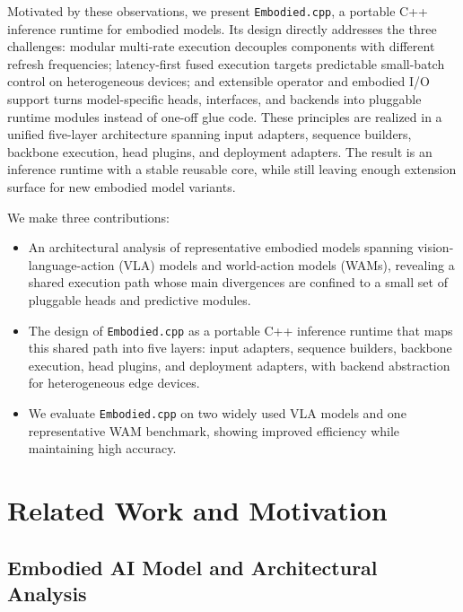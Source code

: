 \documentclass[11pt,letterpaper,logo]{seu-paisys}
\newcommand{\system}{\texttt{Embodied.cpp}\xspace}
\begin{document}
Motivated by these observations, we present \system, a portable C++ inference runtime for embodied models. Its design directly addresses the three challenges: modular multi-rate execution decouples components with different refresh frequencies; latency-first fused execution targets predictable small-batch control on heterogeneous devices; and extensible operator and embodied I/O support turns model-specific heads, interfaces, and backends into pluggable runtime modules instead of one-off glue code. These principles are realized in a unified five-layer architecture spanning input adapters, sequence builders, backbone execution, head plugins, and deployment adapters. The result is an inference runtime with a stable reusable core, while still leaving enough extension surface for new embodied model variants.



We make three contributions:
\begin{itemize}
    \item An architectural analysis of representative embodied models spanning vision-language-action (VLA) models and world-action models (WAMs), revealing a shared execution path whose main divergences are confined to a small set of pluggable heads and predictive modules.
    \item The design of \system as a portable C++ inference runtime that maps this shared path into five layers: input adapters, sequence builders, backbone execution, head plugins, and deployment adapters, with backend abstraction for heterogeneous edge devices.
    \item We evaluate \system on two widely used VLA models and one representative WAM benchmark, showing improved efficiency while maintaining high accuracy.
\end{itemize}

\section{Related Work and Motivation}

\subsection{Embodied AI Model and Architectural Analysis}
\end{document}
